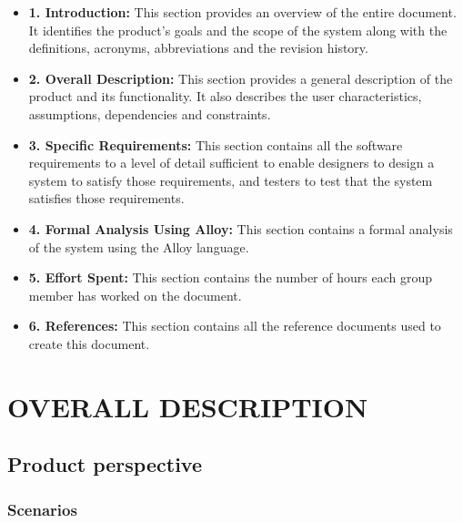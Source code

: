 \documentclass{article}
\begin{document}
\begin{itemize}
    \item \textbf{1. Introduction:} This section provides an overview of the entire document. It identifies the product’s goals and the scope of the system along with the definitions, acronyms, abbreviations and the revision history.
    \item \textbf{2. Overall Description:} This section provides a general description of the product and its functionality. It also describes the user characteristics, assumptions, dependencies and constraints.
    \item \textbf{3. Specific Requirements:} This section contains all the software requirements to a level of detail sufficient to enable designers to design a system to satisfy those requirements, and testers to test that the system satisfies those requirements.
    \item \textbf{4. Formal Analysis Using Alloy:} This section contains a formal analysis of the system using the Alloy language.
    \item \textbf{5. Effort Spent:} This section contains the number of hours each group member has worked on the document.
    \item \textbf{6. References:} This section contains all the reference documents used to create this document.
\end{itemize}

\section{OVERALL DESCRIPTION}
\subsection{Product perspective}
\subsubsection{Scenarios}
\end{document}
